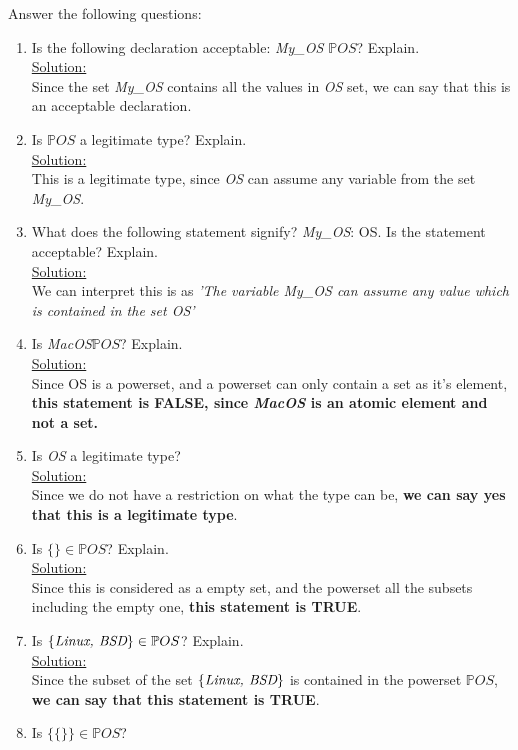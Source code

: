 \noindent Answer the following questions:\
\begin{enumerate}
  \item Is the following declaration acceptable: \emph{My\_OS $\mathbb{P}OS$}? Explain.\\
  \noindent\underline{Solution:}\\ Since the set \emph{My\_OS} contains all the values in \emph{OS} set, we can say that this is an acceptable declaration.
  \item Is $\mathbb{P}OS$ a legitimate type? Explain.\\
  \noindent\underline{Solution:}\\ This is a legitimate type, since \emph{OS} can assume any variable from the set \emph{My\_OS}.
  \item What does the following statement signify? \emph{My\_OS}: OS. Is the statement acceptable? Explain.\\
  \noindent\underline{Solution:}\\ We can interpret this is as \emph{'The variable My\_OS can assume any value which is contained in the set OS' }
  \item Is \emph{MacOS}$\mathbb{P}OS$? Explain.\\
  \noindent\underline{Solution:}\\ Since OS is a powerset, and a powerset can only contain a set as it's element, \textbf{this statement is FALSE, since \emph{MacOS} is an atomic element and not a set.}
  \item Is \emph{OS} a legitimate type?\\
  \noindent\underline{Solution:}\\ Since we do not have a restriction on what the type can be, \textbf{we can say yes that this is a legitimate type}.
  \item Is $\{ \} \in \mathbb{P}OS$? Explain.\\
  \noindent\underline{Solution:}\\ Since this is considered as a empty set, and the powerset all the subsets including the empty one, \textbf{this statement is TRUE}.
  \item Is $\{\emph{Linux, BSD} \} \in \mathbb{P}OS$? Explain.\\
  \noindent\underline{Solution:}\\ Since the subset of the set $\{\emph{Linux, BSD} \}$ is contained in the powerset $\mathbb{P}OS$, \textbf{we can say that this statement is TRUE}.
  \item Is $\{ \{ \} \} \in \mathbb{P}OS$?\\

\end{enumerate}
